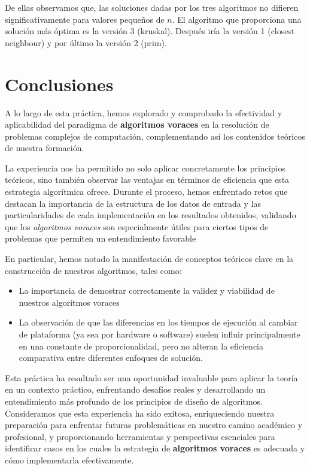 \documentclass{article}
\begin{document}
De ellas observamos que, las soluciones dadas por los tres algoritmos no difieren significativamente para valores pequeños de $n$. El algoritmo que proporciona una solución más óptima es la versión 3 (kruskal). Después iría la versión 1 (closest neighbour) y por último la versión 2 (prim).

\newpage
\section{Conclusiones}
A lo largo de esta práctica, hemos explorado y comprobado la efectividad y aplicabilidad del paradigma de \textbf{algoritmos voraces} en la resolución de problemas complejos de computación, complementando así los contenidos teóricos de nuestra formación.

La experiencia nos ha permitido no solo aplicar concretamente los principios teóricos, sino también observar las ventajas en términos de eficiencia que esta estrategia algorítmica ofrece. Durante el proceso, hemos enfrentado retos que destacan la importancia de la estructura de los datos de entrada y las particularidades de cada implementación en los resultados obtenidos, validando que los \textit{algoritmos voraces} son especialmente útiles para ciertos tipos de problemas que permiten un entendimiento favorable

En particular, hemos notado la manifestación de conceptos teóricos clave en la construcción de nuestros algoritmos, tales como:
\begin{itemize}
    \item La importancia de demostrar correctamente la validez y viabilidad de nuestros algoritmos voraces
    \item La observación de que las diferencias en los tiempos de ejecución al cambiar de plataforma (ya sea por hardware o software) suelen influir principalmente en una constante de proporcionalidad, pero no alteran la eficiencia comparativa entre diferentes enfoques de solución.
\end{itemize}

Esta práctica ha resultado ser una oportunidad invaluable para aplicar la teoría en un contexto práctico, enfrentando desafíos reales y desarrollando un entendimiento más profundo de los principios de diseño de algoritmos. Consideramos que esta experiencia ha sido exitosa, enriqueciendo nuestra preparación para enfrentar futuras problemáticas en nuestro camino académico y profesional, y proporcionando herramientas y perspectivas esenciales para identificar casos en los cuales la estrategia de \textbf{algoritmos voraces} es adecuada y cómo implementarla efectivamente.
\end{document}
